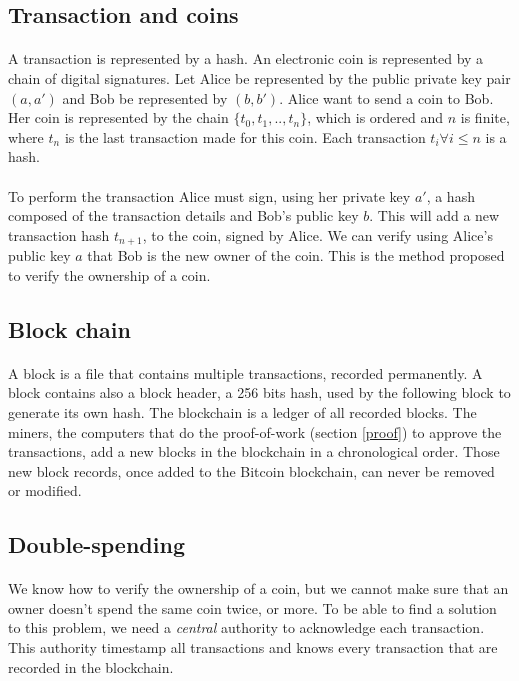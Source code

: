 \documentclass[letterpaper]{article}
\begin{document}
\subsection{Transaction and coins}
\paragraph{}
A transaction is represented by a hash.
An electronic coin is represented by a
chain of digital signatures\cite{bitcoin}.
Let Alice be represented by the public private key pair $(a, a')$
and Bob be represented by $(b, b')$. Alice want to send a coin to Bob.
Her coin
is represented by the chain $\{t_0, t_1, .., t_n \}$, which is ordered
and $n$ is finite, where
$t_n$ is the last transaction made for this coin. Each transaction
$t_i \forall i \le n$ is a hash.

\paragraph{}
To perform the transaction
Alice must sign, using
her private key $a'$,
a hash composed of the transaction details and Bob's public key $b$.
This will add a new
transaction hash $t_{n+1}$, to the coin, signed by Alice.
We can verify using Alice's public key $a$
that Bob is the new owner of the coin.
This is the method proposed to verify the ownership of a coin.

\subsection{Block chain}
\paragraph{}
A block is a file that contains multiple transactions,
recorded permanently\cite{blockwiki}. A block contains also a block header,
a 256 bits hash, used by the following block to generate its own hash.
The blockchain is a ledger of all
recorded blocks. The miners, the computers that do the proof-of-work
(section \ref{proof}) to
approve the transactions, add a new blocks in the blockchain in a
chronological order. Those new block records,
once added to the Bitcoin blockchain, can never be removed or modified.



\subsection{Double-spending}
\paragraph{}
We know how to verify the ownership of a coin, but we cannot make sure
that an owner doesn't spend the same coin twice, or more.
To be able to find a solution to this problem, we need a \textit{central}
authority to acknowledge each transaction. This authority timestamp all
transactions and knows every transaction that are recorded in the blockchain.
\end{document}
